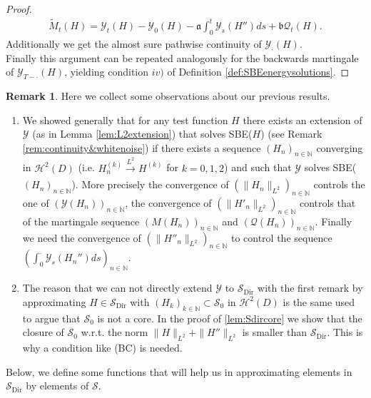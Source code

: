 \documentclass[a4paper, reqno, 12pt]{amsart}
\theoremstyle{plain}
\theoremstyle{definition}
\newtheorem{remark}[definition]{Remark}
\newcommand{\N}{\mathbb{N}}
\newcommand{\Sdir}{\mathcal{S}_{\text{Dir}}}
\begin{document}
\begin{proof}
    \begin{align} \label{eq:stildemartingale}
        \tilde M_t(H) = \mathcal Y_t(H) -\mathcal Y_0(H) - \mathfrak a\int_0^t\mathcal Y_s(H'') ds + \mathfrak b\mathcal  Q_t(H).
    \end{align}
    Additionally we get the almost sure pathwise continuity of $\mathcal Y_{\cdot}(H)$.\\
    Finally this argument can be repeated analogously for the backwards martingale of $\mathcal Y_{T-\cdot}(H)$, yielding condition $iv)$ of Definition \ref{def:SBEenergysolutions}.
\end{proof}

\begin{remark} 
\label{rem:SBEextensions}
Here we collect some observations about our previous results. 
\begin{enumerate}
\item [1.] We showed generally that for any test function $H$ there exists an extension of $\mathcal Y$ (as in Lemma \ref{lem:L2extension}) that solves SBE($H$) (see Remark \eqref{rem:continuity&whitenoise}) if there exists a sequence $(H_n)_{n\in\N}$ converging in $\mathcal{H}^2(D)$ (i.e. $H_n^{(k)}\xrightarrow[]{L^2}H^{(k)}$ for $k=0,1,2$) and such that $\mathcal Y$ solves SBE($(H_n)_{n\in\N}$). More precisely the convergence of $(\|H_n\|_{L^2})_{n \in \mathbb N}$ controls the one of $(\mathcal Y(H_n))_{n \in \mathbb N}$, the convergence of $(\|H'_n\|_{L^2})_{n \in \mathbb N}$ controls that of the martingale sequence $(M(H_n))_{n \in \mathbb N}$ and $(\mathcal Q(H_n))_{n \in \mathbb N}$. Finally we need the convergence of $(\|H''_n\|_{L^2})_{n \in \mathbb N}$ to control the sequence $(\int_0^{\cdot}\mathcal Y_s(H_n'')ds)_{n \in \mathbb N}$. 

\item [2.]The reason that we can not directly extend $\mathcal Y$ to $\Sdir$ with the first remark by approximating $H\in \Sdir$ with $(H_k)_{k\in\N}\subset \mathcal S_0$ in $\mathcal H^2(D)$ is the same used to argue that $\mathcal S_0$ is not a core. In the proof of \ref{lem:Sdircore} we show that the closure of $\mathcal S_0$ w.r.t. the norm $\|H\|_{L^2} +\|H''\|_{L^2}$ is smaller than $\Sdir$. This is why a condition like (BC) is needed.
\end{enumerate}
\end{remark}

Below, we define some functions that will help us in approximating elements in $\Sdir$ by elements of $\mathcal S$.
\end{document}
